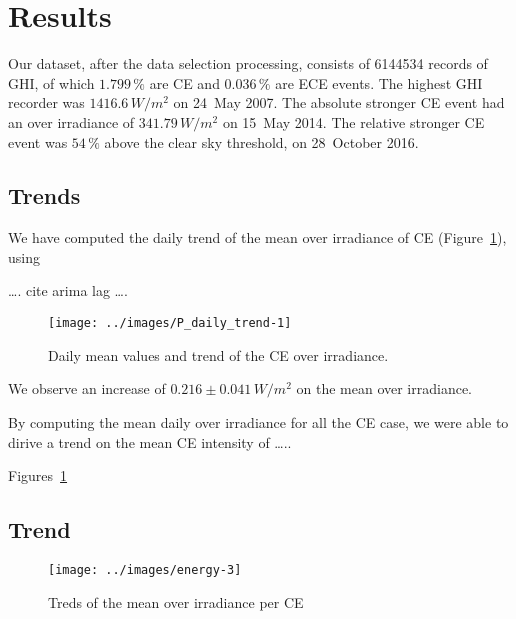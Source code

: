 \documentclass[
]{article}
\begin{document}
\FloatBarrier

\hypertarget{results}{%
\section{Results}\label{results}}

Our dataset, after the data selection processing, consists of
6144534 records of GHI, of which
\(1.799\,\%\) are CE and
\(0.036\,\%\) are ECE events.
The highest GHI recorder was
\(1416.6\,W/m^2\)
on 24~May 2007.
The absolute stronger CE event had an over irradiance of
\(341.79\,W/m^2\) on
15~May 2014.
The relative stronger CE event was
\(54\,\%\) above the
clear sky threshold, on
28~October 2016.

\hypertarget{trends}{%
\subsection{Trends}\label{trends}}

We have computed the daily trend of the mean over irradiance of CE (Figure~\ref{fig:CEmeanDaily}), using

\ldots. cite arima lag \ldots.

\begin{figure}[h!]

{\centering \texttt{[image: ../images/P\_daily\_trend-1]} 

}

\caption{Daily mean values and trend of the CE over irradiance.}\label{fig:CEmeanDaily}
\end{figure}

We observe an increase of
\(0.216\pm 0.041\,W/m^2\)
on the mean over irradiance.

By computing the mean daily over irradiance for all the CE case, we were able to dirive a trend on the mean CE intensity of \ldots..

Figures~\ref{fig:CEmeanDaily}

\hypertarget{trend}{%
\subsection{Trend}\label{trend}}

\begin{figure}[h!]

{\centering \texttt{[image: ../images/energy-3]} 

}

\caption{Treds of the mean over irradiance per CE}\label{fig:unnamed-chunk-1}
\end{figure}
\end{document}
